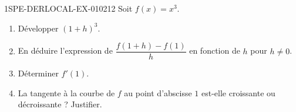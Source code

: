 \begin{exercice}{1SPE-DERLOCAL-EX-010}{2}{12}
Soit $f(x)=x^3$.
\begin{enumerate}
  \item Développer $(1+h)^3$.
  \item En déduire l'expression de $\dfrac{f(1+h)-f(1)}{h}$ en fonction de $h$ pour $h\ne 0$.
  \item Déterminer $f'(1)$.
  \item La tangente à la courbe de $f$ au point d'abscisse $1$ est-elle croissante ou décroissante ? Justifier.
\end{enumerate}
\end{exercice}
